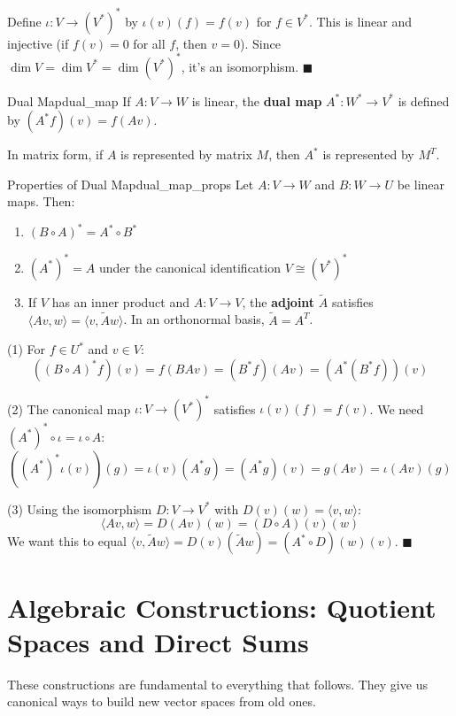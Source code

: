 \documentclass[11pt, letterpaper, openany]{book}
\renewenvironment{proof}[1][\proofname]{%
  \tcolorbox[blanker, breakable, left=1em,
    before skip=1em, after skip=1em,
    borderline west={2pt}{0pt}{MagicTeal!50},
    colback=MagicCream,
    before upper={\textcolor{MagicTeal}{\sffamily\bfseries #1.}\space}
  ]%
}{%
  \hfill\textcolor{MagicTeal}{\ensuremath{\blacksquare}}\endtcolorbox%
}
\begin{document}
\begin{proof}
Define $\iota: V \to (V^*)^*$ by $\iota(v)(f) = f(v)$ for $f \in V^*$. This is linear and injective (if $f(v) = 0$ for all $f$, then $v = 0$). Since $\dim V = \dim V^* = \dim (V^*)^*$, it's an isomorphism.
\end{proof}

\begin{defn}{Dual Map}{dual_map}
If $A: V \to W$ is linear, the \textbf{dual map} $A^*: W^* \to V^*$ is defined by $(A^*f)(v) = f(Av)$.
\end{defn}

In matrix form, if $A$ is represented by matrix $M$, then $A^*$ is represented by $M^T$.

\begin{thm}{Properties of Dual Map}{dual_map_props}
Let $A: V \to W$ and $B: W \to U$ be linear maps. Then:
\begin{enumerate}
    \item $(B \circ A)^* = A^* \circ B^*$
    \item $(A^*)^* = A$ under the canonical identification $V \cong (V^*)^*$
    \item If $V$ has an inner product and $A: V \to V$, the \textbf{adjoint} $\tilde{A}$ satisfies $\langle Av, w \rangle = \langle v, \tilde{A}w \rangle$. In an orthonormal basis, $\tilde{A} = A^T$.
\end{enumerate}
\end{thm}

\begin{proof}
(1) For $f \in U^*$ and $v \in V$:
\[((B \circ A)^* f)(v) = f(BAv) = (B^* f)(Av) = (A^*(B^* f))(v)\]

(2) The canonical map $\iota: V \to (V^*)^*$ satisfies $\iota(v)(f) = f(v)$. We need $(A^*)^* \circ \iota = \iota \circ A$:
\[((A^*)^* \iota(v))(g) = \iota(v)(A^* g) = (A^* g)(v) = g(Av) = \iota(Av)(g)\]

(3) Using the isomorphism $D: V \to V^*$ with $D(v)(w) = \langle v, w \rangle$:
\[\langle Av, w \rangle = D(Av)(w) = (D \circ A)(v)(w)\]
We want this to equal $\langle v, \tilde{A}w \rangle = D(v)(\tilde{A}w) = (A^* \circ D)(w)(v)$.
\end{proof}

\section{Algebraic Constructions: Quotient Spaces and Direct Sums}

These constructions are fundamental to everything that follows. They give us canonical ways to build new vector spaces from old ones.
\end{document}
